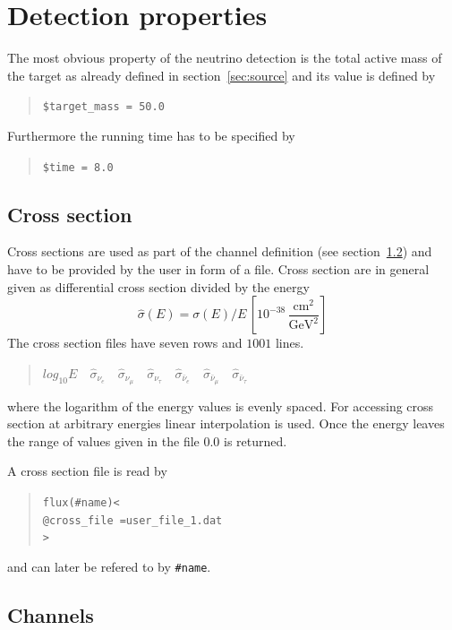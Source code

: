 \section{Detection properties}

The most obvious property of the neutrino detection is the total
active mass of the target as already defined in section~\ref{sec:source} and
its value is defined by 
\begin{quote}
{\tt \$target\_mass = 50.0 }
\end{quote}
Furthermore the running time has to be specified by
\begin{quote}
{\tt \$time = 8.0 }
\end{quote}

\subsection{Cross section}
\label{sec:cross_section}

Cross sections are used as part of the 
channel definition 
(see section~\ref{sec:channel}) and have to be provided by the user in form
of a file. Cross section are in general given as differential cross section
divided by the energy
\begin{equation}
\hat\sigma(E)=\sigma(E)/E\,\left[ 10^{-38}\,
\frac{\mathrm{cm}^2}{\mathrm{GeV}^2} \right]
\end{equation}
The cross section files have seven rows and $1001$ lines.
\begin{quotation}
$log_{10} E\quad
\hat\sigma_{\nu_e}\quad
\hat\sigma_{\nu_\mu}\quad
\hat\sigma_{\nu_\tau}\quad
\hat\sigma_{\bar\nu_e}\quad
\hat\sigma_{\bar\nu_\mu}\quad
\hat\sigma_{\bar\nu_\tau}$
\end{quotation}
where the logarithm of the energy values is evenly spaced. 
For accessing cross section at 
arbitrary energies linear interpolation is used. Once the energy leaves the
range of values given in the file $0.0$ is returned.

A cross section file is read by 
\begin{quote}
{\tt flux(\#name)<}\\
{\tt \hspace*{3ex}@cross\_file =user\_file\_1.dat}\\
{\tt >}
\end{quote}  
and can later be refered to by {\tt \#name}.


\subsection{Channels}
\label{sec:channel}

